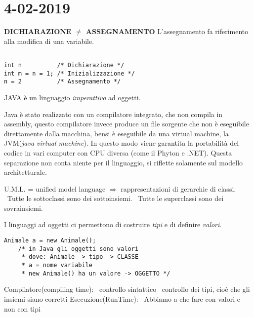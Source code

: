 

\newpage
\section{4-02-2019}
\textbf{DICHIARAZIONE $\neq$ ASSEGNAMENTO} \newline
L'assegnamento fa riferimento alla modifica di una variabile.
\begin{lstlisting}[basicstyle=\small,]

int n		   /* Dichiarazione */
int m = n = 1; /* Inizializzazione */
n = 2 		   /* Assegnamento */

\end{lstlisting}
JAVA è un linguaggio \textit{imperattivo} ad oggetti.

\noindent Java è stato realizzato con un compilatore integrato, che non compila in assembly, questo compilatore invece produce un file sorgente che non è eseguibile direttamente dalla macchina, bensi è eseguibile da una virtual machine, la JVM(\textit{java virtual machine}). In questo modo viene garantita la portabilità del codice in vari computer con CPU diversa (come il Phyton e .NET). \newline
Questa separazione non conta niente per il linguaggio, si riflette solamente sul modello architetturale.

\noindent U.M.L. = unified model language $\Rightarrow$ rappresentazioni di gerarchie di classi. \newline
{} \newline
\textbullet\ Tutte le sottoclassi sono dei sottoinsiemi. \newline
\textbullet\ Tutte le superclassi sono dei sovrainsiemi. 

\noindent I linguaggi ad oggetti ci permettono di costruire \textit{tipi} e di definire \textit{valori}. 
\begin{lstlisting}[basicstyle=\small,]
	Animale a = new Animale();
	/* in Java gli oggetti sono valori
	 * dove: Animale -> tipo -> CLASSE
	 * a = nome variabile
	 * new Animale() ha un valore -> OGGETTO */
\end{lstlisting}

\noindent Compilatore(compiling time): \newline
\textbullet\ controllo sintattico \newline
\textbullet\ controllo dei tipi, cioè che gli insiemi siano corretti \newline
Esecuzione(RunTime):\newline
\textbullet\ Abbiamo a che fare con valori e non con tipi

